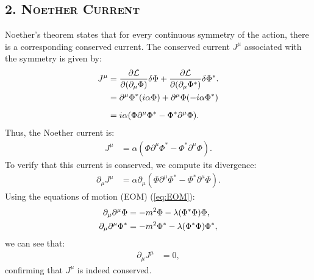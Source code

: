 {\subsection*{\scshape\bf 2. Noether Current}
Noether's theorem states that for every continuous symmetry of the action, there is a corresponding conserved current. The conserved current $J^\mu$ associated with the symmetry is given by:
\begin{align}
    J^\mu &= \frac{\partial \mathcal{L}}{\partial (\partial_\mu \Phi)} \delta \Phi + \frac{\partial \mathcal{L}}{\partial (\partial_\mu \Phi^*)} \delta \Phi^*.\label{eq:noether-current}\notag\\
    &= \partial^\mu \Phi^* (i\alpha \Phi) + \partial^\mu \Phi (-i\alpha \Phi^*) \notag \\[6pt]
    &= i\alpha (\Phi \partial^\mu \Phi^* - \Phi^* \partial^\mu \Phi).
\end{align}
Thus, the Noether current is:
\begin{align}
    J^\mu &= \alpha (\Phi \partial^\mu \Phi^* - \Phi^* \partial^\mu \Phi). \label{eq:Noether-Current}
\end{align}
To verify that this current is conserved, we compute its divergence:
\begin{align}
    \partial_\mu J^\mu &= \alpha \partial_\mu (\Phi \partial^\mu \Phi^* - \Phi^* \partial^\mu \Phi).\label{eq:noether-current-divergence}
\end{align}
Using the equations of motion (EOM) (\ref{eq:EOM}):
\begin{align*}
    \partial_\mu \partial^\mu \Phi &= -m^2 \Phi - \lambda (\Phi^* \Phi) \Phi, \notag \\
    \partial_\mu \partial^\mu \Phi^* &= -m^2 \Phi^* - \lambda (\Phi^* \Phi) \Phi^*,
\end{align*}
we can see that:
\begin{align}
    \partial_\mu J^\mu &= 0,
\end{align}
confirming that $J^\mu$ is indeed conserved.
}
